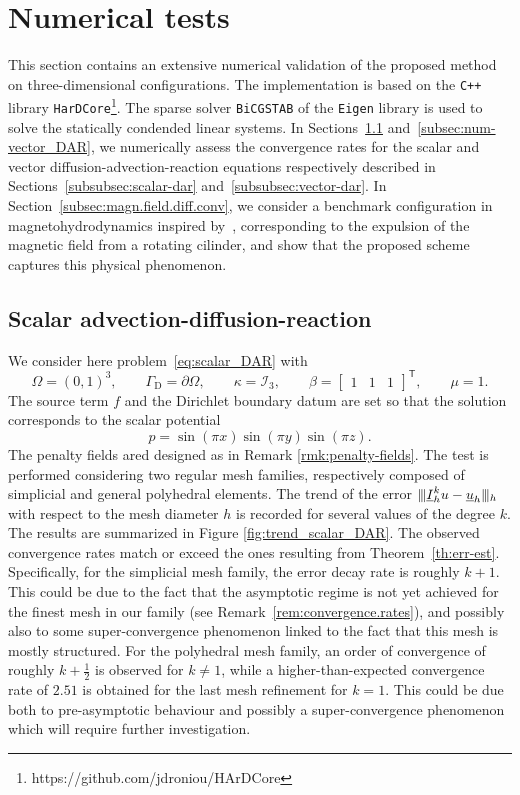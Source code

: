\documentclass[11pt,a4paper]{article}
\newcounter{corr}
\theoremstyle{plain}
\theoremstyle{remark}
\theoremstyle{definition}
\newcommand{\trans}{\mathsf{T}}
\newcommand{\dirichlet}{\mathrm{D}}
\newcommand{\Ih}{\underline{I}_h^k}
\newcommand{\tnorm}[2]{|\kern-0.25ex|\kern-0.25ex|#2|\kern-0.25ex|\kern-0.25ex|_{#1}}
\begin{document}

\section{Numerical tests}\label{sec:numerical.tests}

This section contains an extensive numerical validation of the proposed method on three-dimensional configurations.
The  implementation is based on the \verb|C++| library \verb|HarDCore|\footnote{https://github.com/jdroniou/HArDCore}.
The sparse solver \verb|BiCGSTAB| of the \verb|Eigen| library is used to solve the statically condended linear systems.
In Sections~\ref{subsec:num-scalar_DAR} and~\ref{subsec:num-vector_DAR}, we numerically assess the convergence rates for the scalar and vector diffusion-advection-reaction equations respectively described in Sections~\ref{subsubsec:scalar-dar} and~\ref{subsubsec:vector-dar}.
In Section~\ref{subsec:magn.field.diff.conv}, we consider a benchmark configuration in magnetohydrodynamics inspired by~\cite{Perry.Jones:78}, corresponding to the expulsion of the magnetic field from a rotating cilinder, and show that the proposed scheme captures this physical phenomenon.

\subsection{Scalar advection-diffusion-reaction}\label{subsec:num-scalar_DAR}

We consider here problem~\eqref{eq:scalar_DAR} with
\[
\Omega = (0,1)^3,\qquad
\Gamma_\dirichlet = \partial \Omega,\qquad
\kappa = \mathcal{I}_3,\qquad
\beta = \begin{bmatrix}1 & 1 & 1
\end{bmatrix}^\trans,\qquad
\mu=1.
\]
The source term $f$ and the Dirichlet boundary datum are set so that the solution corresponds to the scalar potential
\[
p = \sin(\pi x) \sin(\pi y) \sin(\pi z).
\]
The penalty fields ared designed as in Remark \ref{rmk:penalty-fields}.
The test is performed considering two regular mesh families,
respectively composed of simplicial and general polyhedral elements.
The trend of the error $\tnorm{h}{\Ih{u}-\underline{u}_h}$ with respect to the mesh diameter $h$
is recorded for several values of the degree $k$. The results are summarized in Figure \ref{fig:trend_scalar_DAR}.
The observed convergence rates match or exceed the ones resulting from Theorem~\ref{th:err-est}.
Specifically, for the simplicial mesh family, the error decay rate is roughly $k + 1$.
This could be due to the fact that the asymptotic regime is not yet achieved for the finest mesh in our family (see Remark~\ref{rem:convergence.rates}), and possibly also to some super-convergence phenomenon linked to the fact that this mesh is mostly structured.
For the polyhedral mesh family, an order of convergence of roughly $k + \frac12$ is observed for $k \neq 1$, while a higher-than-expected convergence rate of $2.51$ is obtained for the last mesh refinement for $k = 1$.
This could be due both to pre-asymptotic behaviour and possibly a super-convergence phenomenon which will require further investigation.
\end{document}
